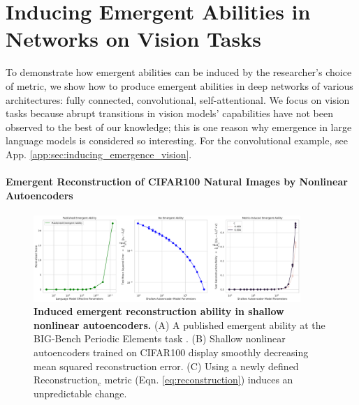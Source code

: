 \section{Inducing Emergent Abilities in Networks on Vision Tasks}
\label{sec:inducing_emergence_vision}

To demonstrate how emergent abilities can be induced by the researcher's choice of metric, we show how to produce emergent abilities in deep networks of various architectures: fully connected, convolutional, self-attentional.
We focus on vision tasks because abrupt transitions in vision models' capabilities have not been observed to the best of our knowledge; this is one reason why emergence in large language models is considered so interesting.
For the convolutional example, see App. \ref{app:sec:inducing_emergence_vision}.

\paragraph{Emergent Reconstruction of CIFAR100 Natural Images by Nonlinear Autoencoders}

\begin{figure}
    \centering
    \includegraphics[width=0.9\textwidth]{figures/vision/no_emergence_and_emergence_dataset=cifar100.pdf}
    \caption{\textbf{Induced emergent reconstruction ability in shallow nonlinear autoencoders.} (A) A published emergent ability at the BIG-Bench Periodic Elements task \cite{srivastava2022beyond}. (B) Shallow nonlinear autoencoders trained on CIFAR100 \cite{krizhevsky09learningmultiple} display smoothly decreasing mean squared reconstruction error. (C) Using a newly defined Reconstruction$_c$ metric (Eqn. \ref{eq:reconstruction}) induces an unpredictable change.}
    \label{fig:vision_cifar100}
\end{figure}

